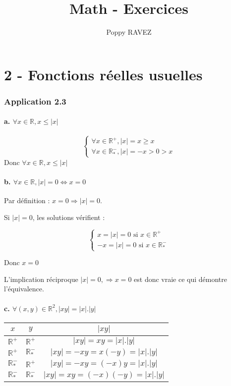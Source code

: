 \documentclass{report}
\title{Math - Exercices}
\author{Poppy RAVEZ}
\begin{document}
\chapter*{2 - Fonctions réelles usuelles}


\subsection*{Application 2.3}

\subsubsection*{a. $\forall x \in \mathbb{R}, x \leq |x|$}

\begin{displaymath}
	\begin{cases}
		\forall x \in \mathbb{R}^{+}, |x| = x \geq x \\
		\forall x \in \mathbb{R}^{-}_{*}, |x| = -x > 0 > x
	\end{cases}
\end{displaymath}
Donc $\forall x \in \mathbb{R}, x \leq |x|$

\subsubsection*{b. $\forall x \in \mathbb{R}, |x| = 0 \Longleftrightarrow x = 0$}

Par définition : $x = 0 \Longrightarrow |x| = 0$.

Si $|x| = 0$, les solutions  vérifient :

\begin{displaymath}
	\begin{cases}
		x = |x| = 0 \text{ si } x \in \mathbb{R}^{+}\\
		-x = |x| = 0 \text{ si } x \in \mathbb{R}^{-}_{*}
	\end{cases}
\end{displaymath}

Donc $x=0$

L'implication réciproque $|x|=0, \Longrightarrow x=0$ est donc vraie ce qui démontre l'équivalence.

\subsubsection*{c. $\forall (x,y) \in \mathbb{R}^2, |xy| = |x|.|y|$}

\begin{tabular}{|c|c|c|}
	\hline
	$x$                  & $y$                  & $|xy|$\\
	\hline
	$\mathbb{R}^{+}$     & $\mathbb{R}^{+}$     & $|xy| = xy = |x|.|y|$ \\
	\hline
	$\mathbb{R}^{+}$     & $\mathbb{R}^{-}_{*}$ & $|xy| = -xy = x(-y) = |x|.|y|$ \\
	\hline
	$\mathbb{R}^{-}_{*}$ & $\mathbb{R}^{+}$     & $|xy| = -xy = (-x)y = |x|.|y|$ \\
	\hline
	$\mathbb{R}^{-}_{*}$ & $\mathbb{R}^{-}_{*}$ & $|xy| = xy =(-x)(-y) = |x|.|y|$ \\
	\hline
\end{tabular}
\end{document}
